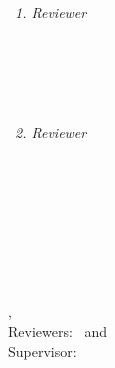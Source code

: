 \begin{titlepage}
	\vfill
	{\large \thesisSubject} \\[5mm]
	{\LARGE \color{ctcolortitle}\textbf{\thesisTitle} \\[10mm]}
	{\Large \thesisName} \\

	\vfill
	\begin{minipage}[t]{.27\textwidth}
		\raggedleft\
		\textit{1. Reviewer}
	\end{minipage}
	\hspace*{15pt}
	\begin{minipage}[t]{.65\textwidth}
		{\Large \thesisFirstReviewer} \\
	  	{\small \thesisFirstReviewerDepartment} \\[-1mm]
		{\small \thesisFirstReviewerUniversity}
	\end{minipage} \\[5mm]
	\begin{minipage}[t]{.27\textwidth}
		\raggedleft\
		\textit{2. Reviewer}
	\end{minipage}
	\hspace*{15pt}
	\begin{minipage}[t]{.65\textwidth}
		{\Large \thesisSecondReviewer} \\
	  	{\small \thesisSecondReviewerDepartment} \\[-1mm]
		{\small \thesisSecondReviewerUniversity}
	\end{minipage} \\[15mm]

	\thesisDate\\ %

\end{titlepage}


\hfill
\vfill
{
	\small
	\textbf{\thesisName} \\
	\textit{\thesisTitle} \\
	\thesisSubject, \thesisDate\\ %
	Reviewers: \thesisFirstReviewer\ and \thesisSecondReviewer\\ %
	Supervisor: \thesisSupervisor\\[1.5em] %
	\textbf{\thesisUniversity} \\
	\textit{\thesisUniversityGroup} \\
	\thesisUniversityInstitute\\ %
	\thesisUniversityDepartment\\ %
	\thesisUniversityStreetAddress\\ %
	\thesisUniversityPostalCode\ \thesisUniversityCity\
}
